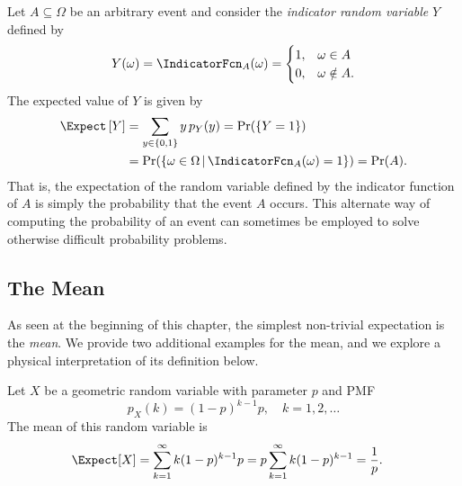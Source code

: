 \begin{example}
Let $A\subseteq \Omega$ be an arbitrary event and consider the \emph{indicator random variable} $Y$ defined by
\begin{equation*}
Y(\omega) = \IndicatorFcn_A (\omega) = \begin{cases} 1, & \omega \in A\\
0, & \omega \notin A. \end{cases}
\end{equation*}
The expected value of $Y$ is given by
\begin{equation*}
\begin{split}
\Expect \left[ Y \right]
&= \sum_{y \in \{0,1\}} y \, p_Y (y) = \Pr (\{Y = 1\}) \\
& = \Pr ( \{ \omega \in \Omega\, | \, \IndicatorFcn_A (\omega) = 1 \} ) = \Pr (A ).
\end{split}
\end{equation*}
That is, the expectation of the random variable defined by the indicator function of $A$ is simply the probability that the event $A$ occurs.
This alternate way of computing the probability of an event can sometimes be employed to solve otherwise difficult probability problems.
\end{example}

\subsection{The Mean}

As seen at the beginning of this chapter, the simplest non-trivial expectation is the \emph{mean}.  
We provide two additional examples for the mean, and we explore a physical interpretation of its definition below.

\begin{example}
Let $X$ be a geometric random variable with parameter $p$ and PMF
\begin{equation*}
p_X (k) = (1-p)^{k-1} p, \quad k = 1, 2, \ldots
\end{equation*}
The mean of this random variable is
\begin{equation*}
\begin{split}
\Expect [X] &= \sum_{k=1}^{\infty} k (1-p)^{k-1} p
= p \sum_{k=1}^{\infty} k (1-p)^{k-1}
= \frac{1}{p} .
\end{split}
\end{equation*}
\end{example}

